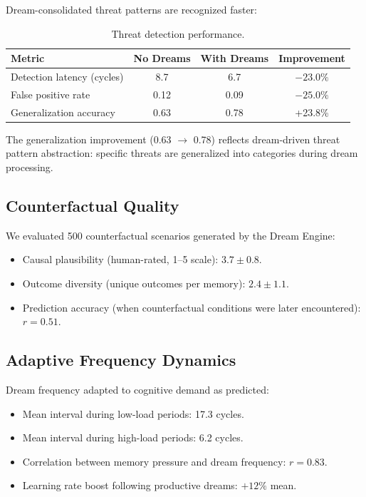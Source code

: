 \documentclass[11pt,a4paper]{article}
\begin{document}
Dream-consolidated threat patterns are recognized faster:

\begin{table}[h]
\centering
\caption{Threat detection performance.}
\label{tab:threat}
\begin{tabular}{@{}lccc@{}}
\toprule
Metric & No Dreams & With Dreams & Improvement \\
\midrule
Detection latency (cycles) & 8.7 & 6.7 & $-23.0\%$ \\
False positive rate & 0.12 & 0.09 & $-25.0\%$ \\
Generalization accuracy & 0.63 & 0.78 & +23.8\% \\
\bottomrule
\end{tabular}
\end{table}

The generalization improvement (0.63 $\to$ 0.78) reflects dream-driven threat pattern abstraction: specific threats are generalized into categories during dream processing.

\subsection{Counterfactual Quality}

We evaluated 500 counterfactual scenarios generated by the Dream Engine:

\begin{itemize}[nosep]
    \item Causal plausibility (human-rated, 1--5 scale): $3.7 \pm 0.8$.
    \item Outcome diversity (unique outcomes per memory): $2.4 \pm 1.1$.
    \item Prediction accuracy (when counterfactual conditions were later encountered): $r = 0.51$.
\end{itemize}

\subsection{Adaptive Frequency Dynamics}

Dream frequency adapted to cognitive demand as predicted:

\begin{itemize}[nosep]
    \item Mean interval during low-load periods: 17.3 cycles.
    \item Mean interval during high-load periods: 6.2 cycles.
    \item Correlation between memory pressure and dream frequency: $r = 0.83$.
    \item Learning rate boost following productive dreams: $+12\%$ mean.
\end{itemize}
\end{document}
